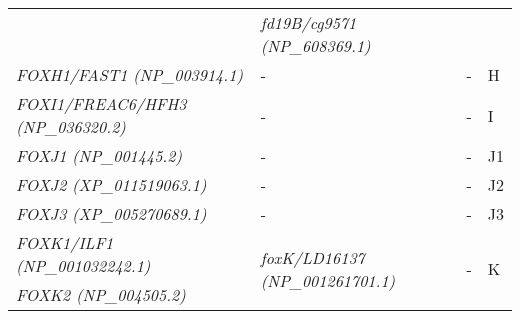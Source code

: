 \documentclass[../main.tex]{subfiles}
\begin{document}
\begin{longtable}{llll}
	                                                        & \textit{fd19B/cg9571 (NP\_608369.1)}                                                                   &                                                                                                    &                       \\ [0.2cm]
	\textit{FOXH1/FAST1 (NP\_003914.1)}                     & -                                                                                                      & -                                                                                                  & H                     \\ [0.1cm]
	\textit{FOXI1/FREAC6/HFH3 (NP\_036320.2)}               & -                                                                                                      & -                                                                                                  & I                     \\ [0.1cm]
	\textit{FOXJ1 (NP\_001445.2)}                           & -                                                                                                      & -                                                                                                  & J1                    \\ [0.1cm]
	\textit{FOXJ2 (XP\_011519063.1)}                        & -                                                                                                      & -                                                                                                  & J2                    \\ [0.1cm]
	\textit{FOXJ3 (XP\_005270689.1)}                        & -                                                                                                      & -                                                                                                  & J3                    \\ [0.1cm]
	\textit{FOXK1/ILF1 (NP\_001032242.1)}                   & \multirow{2}{*}{\textit{foxK/LD16137 (NP\_001261701.1)}}                                               & \multirow{2}{*}{-}                                                                                 & \multirow{2}{*}{K}    \\
	\textit{FOXK2 (NP\_004505.2)}                           &                                                                                                        &                                                                                                    &                       \\ [0.2cm]

\end{longtable}
\end{document}
